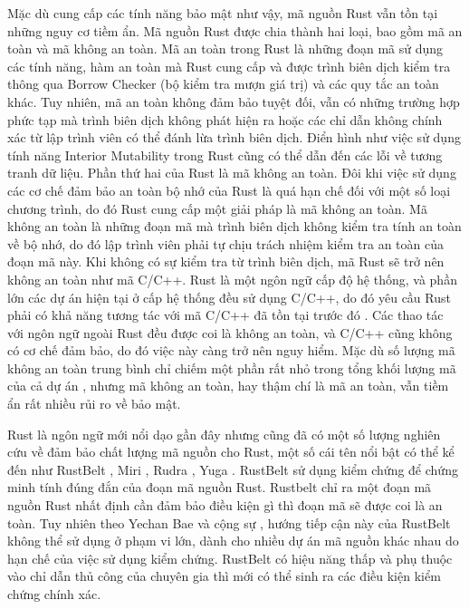 Mặc dù cung cấp các tính năng bảo mật như vậy, mã nguồn Rust vẫn tồn tại những nguy cơ tiềm ẩn.
Mã nguồn Rust được chia thành hai loại, bao gồm mã an toàn và mã không an toàn.
Mã an toàn trong Rust là những đoạn mã sử dụng các tính năng, hàm an toàn mà Rust cung cấp và được trình biên dịch kiểm tra thông qua Borrow Checker (bộ kiểm tra mượn giá trị) \cite{rustlangBorrowingRust} và các quy tắc an toàn khác.
Tuy nhiên, mã an toàn không đảm bảo tuyệt đối, vẫn có những trường hợp phức tạp mà trình biên dịch không phát hiện ra hoặc các chỉ dẫn không chính xác từ lập trình viên có thể đánh lừa trình biên dịch.
Điển hình như việc sử dụng tính năng Interior Mutability \cite{poli2024reasoning} trong Rust cũng có thể dẫn đến các lỗi về tương tranh dữ liệu.
Phần thứ hai của Rust là mã không an toàn.
Đôi khi việc sử dụng các cơ chế đảm bảo an toàn bộ nhớ của Rust là quá hạn chế đối với một số loại chương trình, do đó Rust cung cấp một giải pháp là mã không an toàn.
Mã không an toàn là những đoạn mã mà trình biên dịch không kiểm tra tính an toàn về bộ nhớ, do đó lập trình viên phải tự chịu trách nhiệm kiểm tra an toàn của đoạn mã này.
Khi không có sự kiểm tra từ trình biên dịch, mã Rust sẽ trở nên không an toàn như mã C/C++.
Rust là một ngôn ngữ cấp độ hệ thống, và phần lớn các dự án hiện tại ở cấp hệ thống đều sử dụng C/C++, do đó yêu cầu Rust phải có khả năng tương tác với mã C/C++ đã tồn tại trước đó \cite{sharma2023rust}.
Các thao tác với ngôn ngữ ngoài Rust đều được coi là không an toàn, và C/C++ cũng không có cơ chế đảm bảo, do đó việc này càng trở nên nguy hiểm.
Mặc dù số lượng mã không an toàn trung bình chỉ chiếm một phần rất nhỏ trong tổng khối lượng mã của cả dự án \cite{zheng2023closer}, nhưng mã không an toàn, hay thậm chí là mã an toàn, vẫn tiềm ẩn rất nhiều rủi ro về bảo mật.


Rust là ngôn ngữ mới nổi dạo gần đây nhưng cũng đã có một số lượng nghiên cứu về đảm bảo chất lượng mã nguồn cho Rust, một số cái tên nổi bật có thể kể đến như RustBelt \cite{jung2017rustbelt}, Miri \cite{githubGitHubRustlangmiri}, Rudra \cite{bae2021rudra}, Yuga \cite{nitin2024uga}.
RustBelt sử dụng kiểm chứng để chứng minh tính đúng đắn của đoạn mã nguồn Rust.
Rustbelt chỉ ra một đoạn mã nguồn Rust nhất định cần đảm bảo điều kiện gì thì đoạn mã sẽ được coi là an toàn.
Tuy nhiên theo Yechan Bae và cộng sự \cite{jung2017rustbelt}, hướng tiếp cận này của RustBelt không thể sử dụng ở phạm vi lớn, dành cho nhiều dự án mã nguồn khác nhau do hạn chế của việc sử dụng kiểm chứng.
RustBelt có hiệu năng thấp và phụ thuộc vào chỉ dẫn thủ công của chuyên gia thì mới có thể sinh ra các điều kiện kiểm chứng chính xác.

